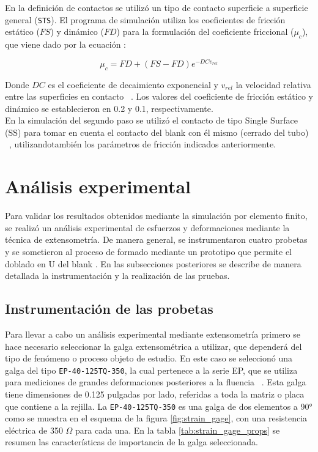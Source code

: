 En la definición de contactos se utilizó un tipo de contacto superficie a superficie
general (\texttt{STS}). El programa de simulación utiliza los coeficientes de fricción 
estático ($FS$) y dinámico ($FD$) para la formulación del coeficiente friccional ($\mu_c$),
que viene dado por la ecuación :

\begin{equation}
\mu_c = FD + (FS - FD) e^{-DCv_{rel}}
\label{eq:frictional_coeff}
\end{equation}

Donde $DC$ es el coeficiente de decaimiento exponencial y $v_{rel}$ la velocidad relativa
entre las superficies en contacto ~\cite{lsdyna-manual}. Los valores del coeficiente de 
fricción estático y dinámico se establecieron en 0.2 y 0.1, respectivamente. ~\cite{carvill1993} \\

En la simulación del segundo paso se utilizó el contacto de tipo Single Surface (SS) para 
tomar en cuenta el contacto del blank con él mismo (cerrado del tubo) ~\cite{lsdyna-manual}, 
utilizandotambién los parámetros de fricción indicados anteriormente.

\section{Análisis experimental}\label{sec:analisis-experimental}

Para validar los resultados obtenidos mediante la simulación por elemento finito, se realizó 
un análisis experimental de esfuerzos y deformaciones mediante la técnica de extensometría. 
De manera general, se instrumentaron cuatro probetas y se sometieron al proceso de formado 
mediante un prototipo que permite el doblado en U del blank . En las subsecciones posteriores se describe 
de manera detallada la instrumentación y la realización de las pruebas.

\subsection{Instrumentación de las probetas}

Para llevar a cabo un análisis experimental mediante extensometría primero se hace necesario 
seleccionar la galga extensométrica a utilizar, que dependerá del tipo de fenómeno o proceso 
objeto de estudio. En este caso se seleccionó una galga del tipo \texttt{EP-40-125TQ-350}, la 
cual pertenece a la serie EP, que se utiliza para mediciones de grandes deformaciones posteriores 
a la fluencia ~\cite{vishay-catalog}. Esta galga tiene dimensiones de 0.125 pulgadas por lado, referidas a toda la 
matriz o placa que contiene a la rejilla. La \texttt{EP-40-125TQ-350} es una galga de dos 
elementos a 90° como se muestra en el esquema de la figura \ref{fig:strain_gage}, con 
una resistencia eléctrica de 350 $\Omega$ para cada una. En la tabla \ref{tab:strain_gage_props} 
se resumen las características de importancia de la galga seleccionada.

